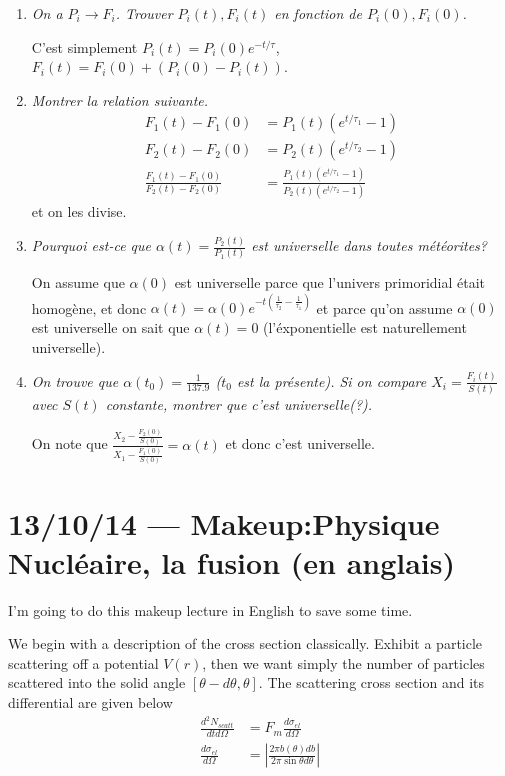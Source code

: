 \documentclass[10pt]{report}
\newcommand{\rd}[2]{\frac{d#1}{d#2}}
\newcommand{\abs}[1]{\left|#1\right|}
\begin{document}
\begin{enumerate}[1.]
    \item \emph{On a $P_i \to F_i$. Trouver $P_i(t), F_i(t)$ en fonction de $P_i(0), F_i(0)$.}

        C'est simplement $P_i(t) = P_i(0)e^{-t/\tau}$, $F_i(t) = F_i(0) + \left( P_i(0) - P_i(t) \right)$.

    \item \emph{Montrer la relation suivante.}
        \begin{align}
            F_1(t) - F_1(0) &= P_1(t)\left( e^{t/\tau_1} - 1 \right)\\
            F_2(t) - F_2(0) &= P_2(t)\left( e^{t/\tau_2} - 1 \right)\\
            \frac{F_1(t) - F_1(0)}{F_2(t) - F_2(0)} &= \frac{P_1(t)\left( e^{t/\tau_1} - 1 \right)}{P_2(t)\left( e^{t/\tau_2} - 1 \right)}
        \end{align}
        et on les divise.
    \item \emph{Pourquoi est-ce que $\alpha(t) = \frac{P_2(t)}{P_1(t)}$ est universelle dans toutes m\'et\'eorites?}

        On assume que $\alpha(0)$ est universelle parce que l'univers primoridial \'etait homog\`ene, et donc $\alpha(t) = \alpha(0)e^{-t\left( \frac{1}{\tau_2} - \frac{1}{\tau_1} \right)}$ et parce qu'on assume $\alpha(0)$ est universelle on sait que $\alpha(t) = 0$ (l'\'exponentielle est naturellement universelle). 
    \item \emph{On trouve que $\alpha(t_0) = \frac{1}{137.9}$ ($t_0$ est la pr\'esente). Si on compare $X_i = \frac{F_i(t)}{S(t)}$ avec $S(t)$ constante, montrer que c'est universelle(?).}

        On note que $\frac{X_2 - \frac{F_2(0)}{S(0)}}{X_1 - \frac{F_1(0)}{S(0)}} = \alpha(t)$ et donc c'est universelle.
\end{enumerate}
\chapter{13/10/14 --- Makeup:Physique Nucl\'eaire, la fusion (en anglais)}

I'm going to do this makeup lecture in English to save some time.

We begin with a description of the cross section classically. Exhibit a particle scattering off a potential $V(r)$, then we want simply the number of particles scattered into the solid angle $\left[ \theta-d\theta, \theta \right]$. The scattering cross section and its differential are given below
\begin{align}
    \frac{d^2N_{scatt}}{dtd\Omega} &= F_m\rd{\sigma_{el}}{\Omega}\\
    \rd{\sigma_{el}}{\Omega} &= \abs{\frac{2\pi b(\theta)db}{2\pi \sin\theta d\theta}}
\end{align}
\end{document}
